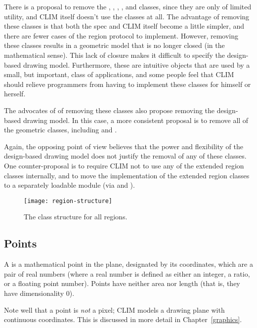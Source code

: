  {There is a proposal to remove the ,
, , , and  classes, since
they are only of limited utility, and CLIM itself doesn't use the classes at
all.  The advantage of removing these classes is that both the spec and CLIM
itself become a little simpler, and there are fewer cases of the region protocol
to implement.  However, removing these classes results in a geometric model that
is no longer closed (in the mathematical sense).  This lack of closure makes it
difficult to specify the design-based drawing model.  Furthermore, these are
intuitive objects that are used by a small, but important, class of
applications, and some people feel that CLIM should relieve programmers from
having to implement these classes for himself or herself.

The advocates of of removing these classes also propose removing the
design-based drawing model.  In this case, a more consistent proposal is to
remove all of the geometric classes, including  and .

Again, the opposing point of view believes that the power and flexibility of the
design-based drawing model does not justify the removal of any of these classes.
One counter-proposal is to require CLIM not to use any of the extended region
classes internally, and to move the implementation of the extended region
classes to a separately loadable module (via  and ).}

\begin{figure}
\centerline{\texttt{[image: region-structure]}}
\caption{The class structure for all regions.}
\end{figure}


\subsection {Points}

A  is a mathematical point in the plane, designated by its
coordinates, which are a pair of real numbers (where a real number is defined as
either an integer, a ratio, or a floating point number).  Points have neither
area nor length (that is, they have dimensionality 0).

Note well that a point is {\sl not} a pixel; CLIM models a drawing plane with
continuous coordinates.  This is discussed in more detail in
Chapter~\ref{graphics}.



